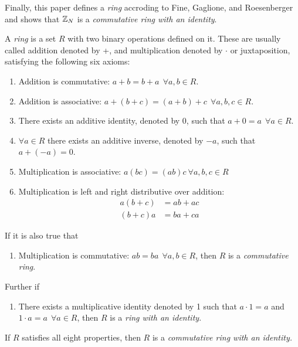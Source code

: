 \par Finally, this paper defines a {\em ring} accroding to Fine, Gaglione, and Roesenberger and
shows that $\mathbb{Z}_N$ is a {\em commutative ring with an identity}.
\begin{definition}
\label{def:ring}
{\rm \cite{FGR-Alg-Method}}
  A {\em ring} is a set $R$ with two binary operations defined on it. These are usually
  called addition denoted by +, and multiplication denoted by $\cdot$ or juxtaposition,
  satisfying the following six axioms:
  \begin{enumerate}
    \item Addition is commutative: $a+b=b+a \ \ \forall a,b \in R$.
    \item Addition is associative: $a+(b+c)=(a+b)+c \ \ \forall a,b,c \in R$.
    \item There exists an additive identity, denoted by 0, such that $a+0=a \ \ \forall a \in R$.
    \item $\forall a \in R$ there exists an additive inverse, denoted by $-a$, such
      that $a+(-a)=0$.
    \item Multiplication is associative: $a(bc)=(ab)c \ \forall a,b,c \in R$
    \item Multiplication is left and right distributive over addition:
      \begin{align*}
        a(b+c)&=ab+ac \\
        (b+c)a&=ba+ca
      \end{align*}
      \setcounter{enumi_saved}{\value{enumi}}
  \end{enumerate}
  If it is also true that
  \begin{enumerate}
      \setcounter{enumi}{\value{enumi_saved}}
    \item Multiplication is commutative: $ab=ba \ \ \forall a,b \in R$, then
      $R$ is a {\em commutative ring}.
      \setcounter{enumi_saved}{\value{enumi}}
  \end{enumerate}
  Further if
  \begin{enumerate}
      \setcounter{enumi}{\value{enumi_saved}}
    \item There exists a multiplicative identity denoted by 1 such that
      $a \cdot 1=a$ and $1 \cdot a=a \ \ \forall a \in R$, then $R$ is a
      {\em ring with an identity}.
  \end{enumerate}
  If $R$ satisfies all eight properties, then $R$ is a {\em commutative ring with
  an identity.}
\end{definition}

